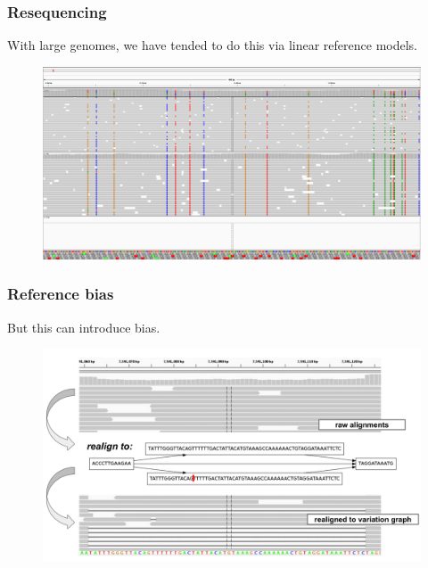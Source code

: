\documentclass{beamer}
\begin{document}
\begin{frame}
    \frametitle{Resequencing}
With large genomes, we have tended to do this via linear reference models.

\begin{figure}
  \includegraphics[scale=0.2,center]{TqkY9nw1.png}
\end{figure}
\end{frame}

\begin{frame}
  \frametitle{Reference bias}
  But this can introduce bias.

  \begin{figure}
    \includegraphics[scale=0.14,center]{igv_graph_realign.png}
    \end{figure}
\end{frame}
\end{document}
